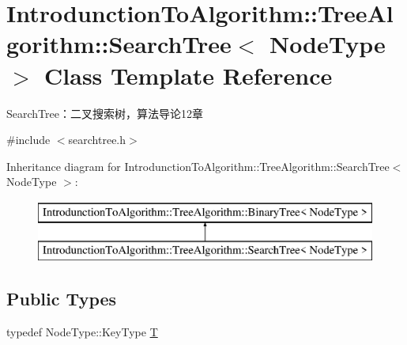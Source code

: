\hypertarget{class_introdunction_to_algorithm_1_1_tree_algorithm_1_1_search_tree}{}\section{Introdunction\+To\+Algorithm\+:\+:Tree\+Algorithm\+:\+:Search\+Tree$<$ Node\+Type $>$ Class Template Reference}
\label{class_introdunction_to_algorithm_1_1_tree_algorithm_1_1_search_tree}


Search\+Tree：二叉搜索树，算法导论12章  




{\ttfamily \#include $<$searchtree.\+h$>$}

Inheritance diagram for Introdunction\+To\+Algorithm\+:\+:Tree\+Algorithm\+:\+:Search\+Tree$<$ Node\+Type $>$\+:\begin{figure}[H]
\begin{center}
\leavevmode
\includegraphics[height=2.000000cm]{class_introdunction_to_algorithm_1_1_tree_algorithm_1_1_search_tree}
\end{center}
\end{figure}
\subsection*{Public Types}
\begin{DoxyCompactItemize}
\item 
typedef Node\+Type\+::\+Key\+Type \hyperlink{class_introdunction_to_algorithm_1_1_tree_algorithm_1_1_search_tree_a455a92d072da5c55c969cdfc0e71ac2e}{T}
\end{DoxyCompactItemize}
